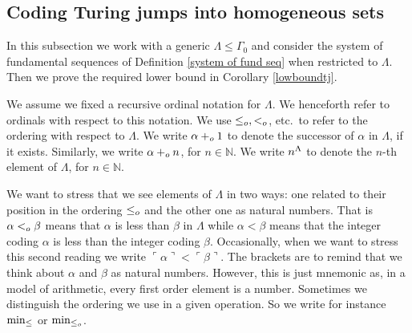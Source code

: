 \documentclass[11pt]{amsart}
\theoremstyle{definition}
\theoremstyle{remark}
\theoremstyle{plain}
\newcommand{\numberset}{\mathbb}
\newcommand{\N}{\numberset{N}}
\def\a{\alpha}
\def\G{\Gamma}
\def\WO{{\textrm{WO}}}
\newcommand{\leo}{<\sb{o}}
\newcommand{\leqo}{\leq\sb{o}}
\newcommand{\pluso}{+\sb{o}}
\newcommand{\gd}[1]{{\ulcorner{#1}\urcorner}}
\def\N{{\mathbb{N}}}
\newcommand{\lorenzo}[1]{\textcolor{blue}{#1}}
\newcommand{\andrea}[1]{\textcolor{green}{#1}}
\begin{document}
%
%

\subsection{Coding Turing jumps into homogeneous sets}

%
%


In this subsection we work with a generic $\Lambda \le \G_0$ and consider the system of fundamental sequences of Definition \ref{system of fund seq} when restricted to $\Lambda$.
Then we prove the required lower bound in Corollary \ref{lowboundtj}.

We assume we fixed a recursive ordinal notation for $\Lambda$.  
We henceforth refer to ordinals with respect to this notation. 
We use $\leqo,\leo$, etc.\ to refer to the ordering with respect to $\Lambda$.
We write $\alpha\pluso 1$ to denote the successor of $\alpha$ in $\Lambda$, if it exists. 
Similarly, we write $\alpha\pluso n$, for $n\in\N$. 
We write $n\sp{\Lambda}$ to denote the $n$-th element of $\Lambda$, for $n\in \N$.

We want to stress that we see elements of $\Lambda$ in two ways: one related to their position in the ordering $\leqo$ and the other one as natural numbers. 
That is $\a \leo \beta$ means that $\a$ is less than $\beta$ in $\Lambda$ while $\a < \beta$ means that the integer coding $\a$ is less than the integer coding $\beta$. 
Occasionally, when we want to stress this second reading we write $\gd\alpha <\gd\beta$. 
The brackets are to remind that we think about $\alpha$ and $\beta$ as natural numbers. 
However, this is just mnemonic as, in a model of arithmetic, every first order element is a number.
Sometimes we distinguish the ordering we use in a given operation. 
So we write for instance $\min\sb{\leq}$ or $\min\sb{\leqo}$.

\end{document}
